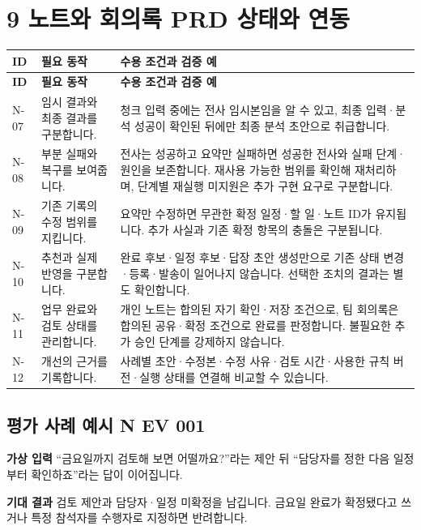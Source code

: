 \documentclass[a4paper,10pt]{article}
\newcommand{\Hline}{\noalign{\hrule height 1.5pt}}
\begin{document}
\clearpage
\section*{9 노트와 회의록 PRD 상태와 연동}
{\fontsize{9.5}{14.06}\selectfont
\begin{longtable}{!{\vrule width 1.5pt}L{18.94mm}|L{55.23mm}|L{83.63mm}!{\vrule width 1.5pt}}
\Hline{} \textbf{ID} & \textbf{필요 동작} & \textbf{수용 조건과 검증 예}\\\hline\endfirsthead
\Hline{} \textbf{ID} & \textbf{필요 동작} & \textbf{수용 조건과 검증 예}\\\hline\endhead
\hline\endfoot\Hline\endlastfoot
N-07 & 임시 결과와 최종 결과를 구분합니다. & 청크 입력 중에는 전사 임시본임을 알 수 있고, 최종 입력·분석 성공이 확인된 뒤에만 최종 분석 초안으로 취급합니다.\\\hline
N-08 & 부분 실패와 복구를 보여줍니다. & 전사는 성공하고 요약만 실패하면 성공한 전사와 실패 단계·원인을 보존합니다. 재사용 가능한 범위를 확인해 재처리하며, 단계별 재실행 미지원은 추가 구현 요구로 구분합니다.\\\hline
N-09 & 기존 기록의 수정 범위를 지킵니다. & 요약만 수정하면 무관한 확정 일정·할 일·노트 ID가 유지됩니다. 추가 사실과 기존 확정 항목의 충돌은 구분됩니다.\\\hline
N-10 & 추천과 실제 반영을 구분합니다. & 완료 후보·일정 후보·답장 초안 생성만으로 기존 상태 변경·등록·발송이 일어나지 않습니다. 선택한 조치의 결과는 별도 확인합니다.\\\hline
N-11 & 업무 완료와 검토 상태를 관리합니다. & 개인 노트는 합의된 자기 확인·저장 조건으로, 팀 회의록은 합의된 공유·확정 조건으로 완료를 판정합니다. 불필요한 추가 승인 단계를 강제하지 않습니다.\\\hline
N-12 & 개선의 근거를 기록합니다. & 사례별 초안·수정본·수정 사유·검토 시간·사용한 규칙 버전·실행 상태를 연결해 비교할 수 있습니다.\\\hline
\end{longtable}}
\subsection*{평가 사례 예시 N EV 001}
\noindent\textbf{가상 입력} “금요일까지 검토해 보면 어떨까요?”라는 제안 뒤 “담당자를 정한 다음 일정부터 확인하죠”라는 답이 이어집니다.


\noindent\textbf{기대 결과} 검토 제안과 담당자·일정 미확정을 남깁니다. 금요일 완료가 확정됐다고 쓰거나 특정 참석자를 수행자로 지정하면 반려합니다.
\end{document}
